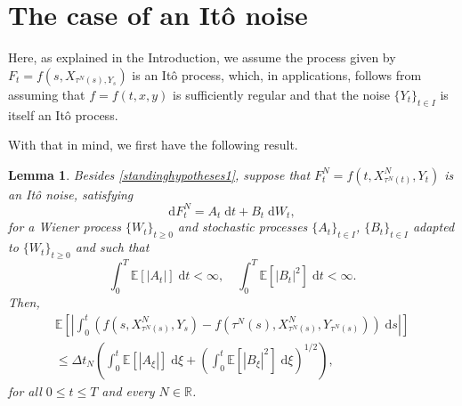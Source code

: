 \documentclass[reqno,12pt]{amsart}
\theoremstyle{plain}%
\newtheorem{lem}{Lemma}[section]
\theoremstyle{definition}
\begin{document}
\section{The case of an It\^o noise}
\label{secItonoise}

Here, as explained in the Introduction, we assume the process given by $F_t = f(s, X_{\tau^N(s), Y_s})$ is an It\^o process, which, in applications, follows from assuming that $f=f(t, x, y)$ is sufficiently regular and that the noise $\{Y_t\}_{t\in I}$ is itself an It\^o process.

With that in mind, we first have the following result.
\begin{lem}
    \label{lemItostep}
    Besides \cref{standinghypotheses1}, suppose that $F_t^N = f(t, X_{\tau^N(t)}^N, Y_t)$ is an It\^o noise, satisfying
    \begin{equation}
        \label{Itostep}
        \mathrm{d}F_t^N = A_t\;\mathrm{d}t + B_t\;\mathrm{d}W_t,
    \end{equation}
    for a Wiener process $\{W_t\}_{t\geq 0}$ and stochastic processes $\{A_t\}_{t\in I}$, $\{B_t\}_{t\in I}$ adapted to $\{W_t\}_{t\geq 0}$ and such that
    \begin{equation}
        \label{expectItostepterms}
        \int_0^T \mathbb{E}[|A_t|] \;\mathrm{d}t < \infty, \quad \int_0^T \mathbb{E}[|B_t|^2] \;\mathrm{d}t < \infty.
    \end{equation}
    Then,
    \begin{multline}
        \label{expectintfboundbyIto}
        \mathbb{E}\left[\left|\int_0^t \left(f(s, X_{\tau^N(s)}^N, Y_s) - f(\tau^N(s), X_{\tau^N(s)}^N, Y_{\tau^N(s)})\right)\;\mathrm{d}s\right|\right]  \\
        \leq \Delta t_N \left(\int_0^t \mathbb{E}[|A_\xi|] \;\mathrm{d}\xi + \left(\int_0^t \mathbb{E}[|B_\xi|^2] \;\mathrm{d}\xi \right)^{1/2}\right),
    \end{multline}
    for all $0 \leq t \leq T$ and every $N\in \mathbb{R}$.
\end{lem}
\end{document}
